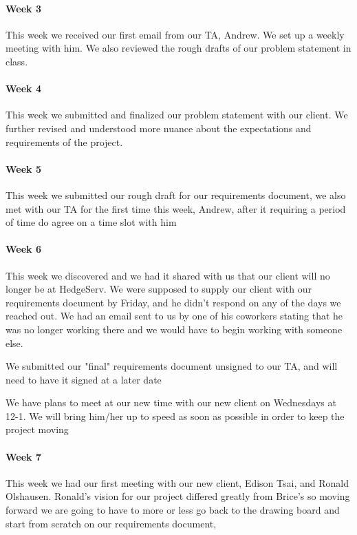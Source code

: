 \documentclass[onecolumn, draftclsnofoot,10pt, compsoc]{IEEEtran}
\begin{document}
    \paragraph{Week 3}
    This week we received our first email from our TA, Andrew. We set up a weekly meeting with him. We also reviewed the rough drafts of our problem statement in class.
    
    
    \paragraph{Week 4}
    This week we submitted and finalized our problem statement with our client. We further revised and understood more nuance about the expectations and requirements of the project.

    
    \paragraph{Week 5}
       This week we submitted our rough draft for our requirements document, we also met with our TA for the first time this week, Andrew, after it requiring a period of time do agree on a time slot with him 
    
    \paragraph{Week 6}
        This week we discovered and we had it shared with us that our client will no longer be at HedgeServ. We were supposed to supply our client with our requirements document by Friday, and he didn't respond on any of the days we reached out. We had an email sent to us by one of his coworkers stating that he was no longer working there and we would have to begin working with someone else. 
 
        We submitted our "final" requirements document unsigned to our TA, and will need to have it signed at a later date 
        
        We have plans to meet at our new time with our new client on Wednesdays at 12-1. We will bring him/her up to speed as soon as possible in order to keep the project moving 
            
    
    \paragraph{Week 7}
        This week we had our first meeting with our new client, Edison Tsai, and Ronald Olshausen. Ronald's vision for our project differed greatly from Brice's so moving forward we are going to have to more or less go back to the drawing board and start from scratch on our requirements document, 
 
\end{document}
